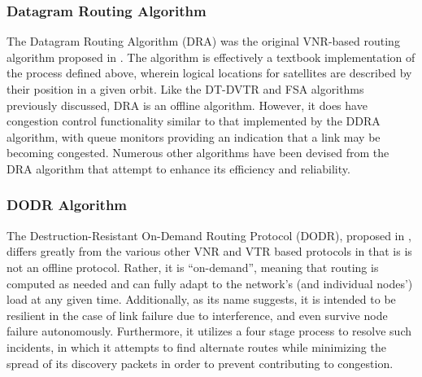 \subsubsection{Datagram Routing Algorithm}\label{subsec:dra}
The Datagram Routing Algorithm (DRA) was the original VNR-based routing algorithm proposed in \cite{ekici_datagram_2000}. The algorithm is effectively a textbook implementation of the process defined above, wherein logical locations for satellites are described by their position in a given orbit. Like the DT-DVTR and FSA algorithms previously discussed, DRA is an offline algorithm. However, it does have congestion control functionality similar to that implemented by the DDRA algorithm, with queue monitors providing an indication that a link may be becoming congested. Numerous other algorithms have been devised from the DRA algorithm that attempt to enhance its efficiency and reliability.

\subsubsection{DODR Algorithm}\label{subsubsec:dodr}
The Destruction-Resistant On-Demand Routing Protocol (DODR), proposed in \cite{ji_destruction-resistant_2015}, differs greatly from the various other VNR and VTR based protocols in that is is not an offline protocol. Rather, it is ``on-demand'', meaning that routing is computed as needed and can fully adapt to the network's (and individual nodes') load at any given time. Additionally, as its name suggests, it is intended to be resilient in the case of link failure due to interference, and even survive node failure autonomously. Furthermore, it utilizes a four stage process to resolve such incidents, in which it attempts to find alternate routes while minimizing the spread of its discovery packets in order to prevent contributing to congestion.